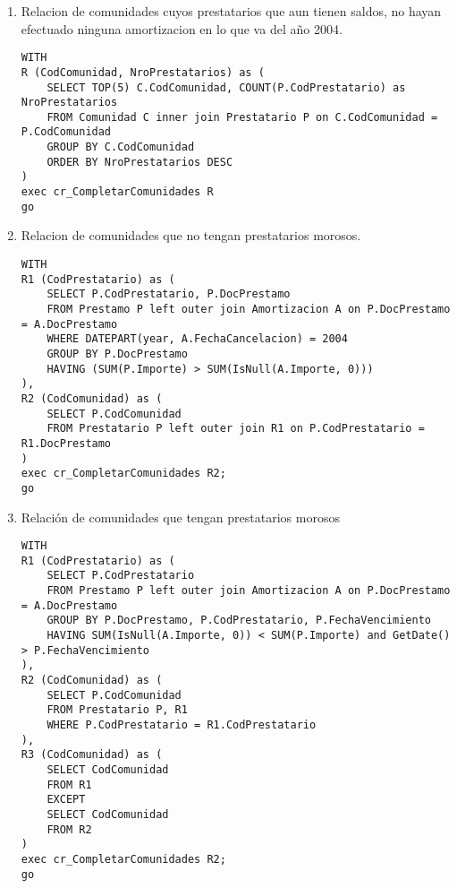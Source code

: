 \begin{enumerate}
\skiplines{}
\item Relacion de comunidades cuyos prestatarios que aun tienen saldos, no
hayan efectuado ninguna amortizacion en lo que va del año 2004.

\begin{verbatim}
WITH
R (CodComunidad, NroPrestatarios) as (
    SELECT TOP(5) C.CodComunidad, COUNT(P.CodPrestatario) as NroPrestatarios
    FROM Comunidad C inner join Prestatario P on C.CodComunidad = P.CodComunidad
    GROUP BY C.CodComunidad
    ORDER BY NroPrestatarios DESC
)
exec cr_CompletarComunidades R
go
\end{verbatim}

\item Relacion de comunidades que no tengan prestatarios morosos.

\begin{verbatim}
WITH
R1 (CodPrestatario) as (
    SELECT P.CodPrestatario, P.DocPrestamo
    FROM Prestamo P left outer join Amortizacion A on P.DocPrestamo = A.DocPrestamo
    WHERE DATEPART(year, A.FechaCancelacion) = 2004
    GROUP BY P.DocPrestamo
    HAVING (SUM(P.Importe) > SUM(IsNull(A.Importe, 0)))
),
R2 (CodComunidad) as (
    SELECT P.CodComunidad
    FROM Prestatario P left outer join R1 on P.CodPrestatario = R1.DocPrestamo
)
exec cr_CompletarComunidades R2;
go
\end{verbatim}

\item Relación de comunidades que tengan prestatarios morosos

\begin{verbatim}
WITH
R1 (CodPrestatario) as (
    SELECT P.CodPrestatario
    FROM Prestamo P left outer join Amortizacion A on P.DocPrestamo = A.DocPrestamo
    GROUP BY P.DocPrestamo, P.CodPrestatario, P.FechaVencimiento
    HAVING SUM(IsNull(A.Importe, 0)) < SUM(P.Importe) and GetDate() > P.FechaVencimiento
),
R2 (CodComunidad) as (
    SELECT P.CodComunidad
    FROM Prestatario P, R1
    WHERE P.CodPrestatario = R1.CodPrestatario
),
R3 (CodComunidad) as (
    SELECT CodComunidad
    FROM R1
    EXCEPT
    SELECT CodComunidad
    FROM R2
)
exec cr_CompletarComunidades R2;
go
\end{verbatim}

\end{enumerate}
